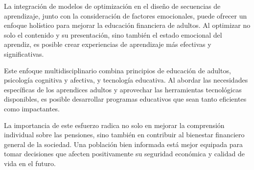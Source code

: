 La integración de modelos de optimización en el diseño de secuencias de aprendizaje, junto con la consideración de factores emocionales, puede ofrecer un enfoque holístico para mejorar la educación financiera de adultos. Al optimizar no solo el contenido y su presentación, sino también el estado emocional del aprendiz, es posible crear experiencias de aprendizaje más efectivas y significativas.

Este enfoque multidisciplinario combina principios de educación de adultos, psicología cognitiva y afectiva, y tecnología educativa. Al abordar las necesidades específicas de los aprendices adultos y aprovechar las herramientas tecnológicas disponibles, es posible desarrollar programas educativos que sean tanto eficientes como impactantes.

La importancia de este esfuerzo radica no solo en mejorar la comprensión individual sobre las pensiones, sino también en contribuir al bienestar financiero general de la sociedad. Una población bien informada está mejor equipada para tomar decisiones que afecten positivamente su seguridad económica y calidad de vida en el futuro.

